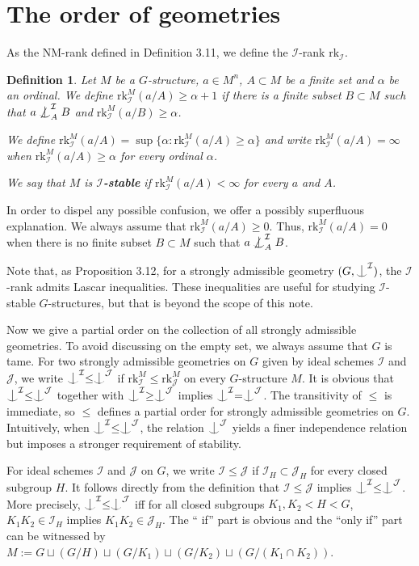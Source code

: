 \documentclass{article}
\newtheorem{definition}{Definition}
\newcommand{\rk}{\mathrm{rk}}
\newcommand{\J}{\mathcal{J}}
\newcommand{\I}{\mathcal{I}}
\newcommand{\ind}{\mathrel{\raise0.2ex\hbox{\ooalign{\hidewidth$\vert$\hidewidth\cr\raise-0.9ex\hbox{$\smile$}}}}}
\begin{document}
\section{The order of geometries}\label{section-3}


As the NM-rank defined in \cite{KP} Definition 3.11, we define the $\I$-rank $\rk_\I$. 
\begin{definition}
Let $M$ be a $G$-structure, $a\in M^n$, $A\subset M$ be a finite set and $\alpha$ be an ordinal. We define 
$\rk_\I^M(a/A)\geq \alpha+1$ if there is a finite subset $B\subset M$ such that $a\not\ind_A^\I B $ and $\rk_\I^M(a/B)\geq \alpha$. 

We define $\rk_\I^M(a/A)=\sup\{\alpha: \rk_\I^M(a/A)\geq \alpha\}$ and write $\rk_\I^M(a/A)=\infty$ when $\rk_\I^M(a/A)\geq \alpha$ for every ordinal $\alpha$. 

We say that $M$ is \textbf{$\I$-stable} if  $\rk_\I^M(a/A)< \infty$ for every $a$ and $A$.
\end{definition}

In order to dispel any possible confusion, we offer a possibly superfluous explanation.
We always assume that $\rk_\I^M(a/A) \geq 0$. 
Thus, $\rk_\I^M(a/A) =0$ when there is no finite subset $B\subset M$ such that $a\not\ind_A^\I B $.

Note that, as \cite{KP} Proposition 3.12, for a strongly admissible geometry $(G,\ind^\I)$, the $\I$-rank admits Lascar inequalities. These inequalities are useful for studying $\I$-stable $G$-structures, but that is beyond the scope of this note.

Now we give a partial order on the collection of all strongly admissible geometries. To avoid discussing on the empty set, we always assume that $G$ is tame.
For two strongly admissible geometries on $G$ given by ideal schemes $\I$ and $\J$, we write $\ind^\I\leq \ind^\J$ if $\rk_{\I}^M\leq \rk_{\J}^M$ on every $G$-structure $M$. It is obvious that $\ind^\I\leq \ind^\J$ together with $\ind^\I\geq \ind^\J$ implies $\ind^\I= \ind^\J$. The transitivity of 
$\leq$ is immediate, so 
$\leq$ defines a partial order for strongly admissible geometries on $G$. Intuitively, when $\ind^\I \leq \ind^\J$, the relation $\ind^\J$ yields a finer independence relation but imposes a stronger requirement of stability.

For ideal schemes $\I$ and $\J$ on $G$, we write $\I\leq \J$ if $\I_H\subset \J_H$ for every closed subgroup $H$. It follows directly from the definition that $\I\leq \J$ implies $\ind^\I\leq \ind^\J$. More precisely, $\ind^\I\leq \ind^\J$ iff for all closed subgroups $K_1,K_2<H<G$, $K_1K_2\in \I_H$ implies $K_1K_2\in \J_H$. The `` if'' part is obvious and the ``only if'' part can be witnessed by $M:=G\sqcup (G/H)\sqcup (G/K_1)\sqcup (G/K_2)\sqcup(G/(K_1\cap K_2))$.
\end{document}
